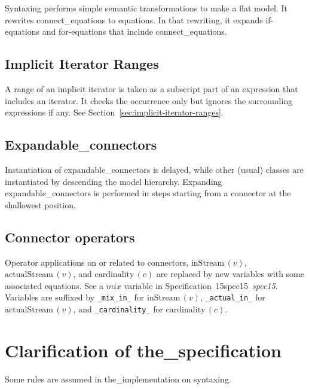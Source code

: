 \documentclass[10pt,b5paper]{article}
\def\specrefx#1#2{Specification~#1\ifx\relax#2\relax{}\else~{\it{}#2}\fi}
\def\specref#1{\specrefx{#1}{\csname spec#1\endcsname}}
\begin{document}
{Syntaxing} performs simple semantic transformations to make a flat
model.  It rewrites connect_equations to equations.  In that
rewriting, it expands if-equations and for-equations that include
connect_equations.


\subsection{Implicit Iterator Ranges}

A range of an implicit iterator is taken as a subscript part of an
expression that includes an iterator.  It checks the occurrence only
but ignores the surrounding expressions if any.  See
Section~\ref{sec:implicit-iterator-ranges}.


\subsection{Expandable_connectors}

Instantiation of expandable_connectors is delayed, while other (usual)
classes are instantiated by descending the model hierarchy.  Expanding
expandable_connectors is performed in steps starting from a connector
at the shallowest position.


\subsection{Connector operators}

Operator applications on or related to connectors,
$\mathrm{inStream}\,(v)$, $\mathrm{actualStream}\,(v)$, and
$\mathrm{cardinality}\,(c)$ are replaced by new variables with some
associated equations.  See a $\mathit{mix}$ variable in \specref{15}.
Variables are suffixed by \verb|_mix_in_| for
$\mathrm{inStream}\,(v)$, \verb|_actual_in_| for
$\mathrm{actualStream}\,(v)$, and \verb|_cardinality_| for
$\mathrm{cardinality}\,(c)$.


\section{Clarification of the_specification}

Some rules are assumed in the_implementation on syntaxing.
\end{document}
